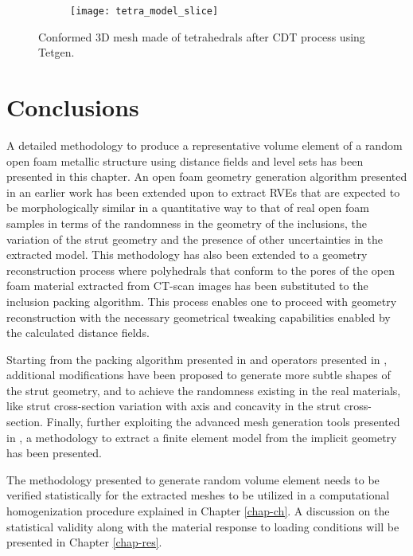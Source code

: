 \begin{figure}
	\centering
	\begin{subfigure}[b]{0.65\textwidth}
		\texttt{[image: tetra\_model\_slice]}

	\end{subfigure}
	\caption{Conformed 3D mesh made of tetrahedrals after CDT process using Tetgen.}\label{fig:tetra_section}
\end{figure}

\section{Conclusions}
A detailed methodology to produce a representative volume element of a random open foam metallic structure using distance fields and level sets has been presented in this chapter. An open foam geometry generation algorithm presented in an earlier work has been extended upon to extract RVEs that are expected to be morphologically similar in a quantitative way to that of real open foam samples in terms of the randomness in the geometry of the inclusions, the variation of the strut geometry and the presence of other uncertainties in the extracted model. This methodology has also been extended to a geometry reconstruction process where polyhedrals that conform to the pores of the open foam material extracted from CT-scan images has been substituted to the inclusion packing algorithm. This process enables one to proceed with geometry reconstruction with the necessary geometrical tweaking capabilities enabled by the calculated distance fields.

Starting from the packing algorithm presented in \cite{sononUnifiedLevelSet2012} and operators presented in \cite{sononAdvancedApproachGeneration2015}, additional modifications have been proposed to generate more subtle shapes of the strut geometry, and to achieve the randomness existing in the real materials, like  strut cross-section variation with axis and concavity in the strut cross-section. Finally, further exploiting the advanced mesh generation tools presented in \cite{ehabmoustafakamelIntegratedApproachConformal2019}, a methodology to extract a finite element model from the implicit geometry has been presented.

The methodology presented to generate random volume element needs to be verified statistically for the extracted meshes to be utilized in a computational homogenization procedure explained in Chapter \ref{chap-ch}. A discussion on the statistical validity along with the material response to loading conditions will be presented in Chapter \ref{chap-res}.

